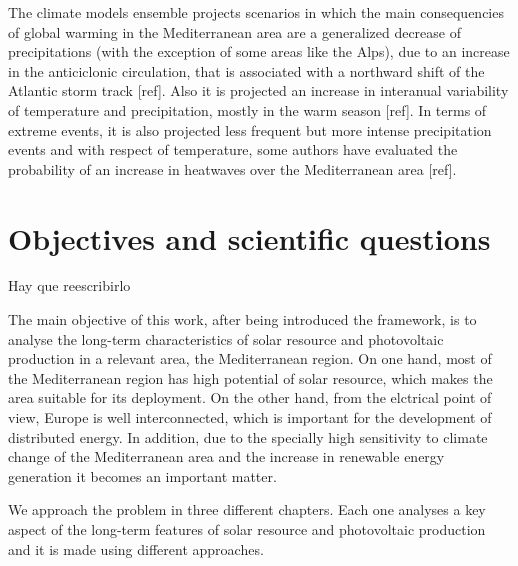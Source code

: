
The climate models ensemble projects scenarios in which the main consequencies of global warming in the Mediterranean area are a generalized decrease of precipitations (with the exception of some areas like the Alps), due to an increase in the anticiclonic circulation, that is associated with a northward shift of the Atlantic storm track [ref]. Also it is projected an increase in interanual variability of temperature and precipitation, mostly in the warm season [ref]. In terms of extreme events, it is also projected less frequent but more intense precipitation events and with respect of temperature, some authors have evaluated the probability of an increase in heatwaves over the Mediterranean area [ref].   

\section{Objectives and scientific questions}%

{\color{red} Hay que reescribirlo}

The main objective of this work, after being introduced the framework, is to analyse the long-term characteristics of solar resource and photovoltaic production in a relevant area, the Mediterranean region. On one hand, most of the Mediterranean region has high potential of solar resource, which makes the area suitable for its deployment. On the other hand, from the elctrical point of view, Europe is well interconnected, which is important for the development of distributed energy. In addition, due to the specially high sensitivity to climate change of the Mediterranean area and the increase in renewable energy generation it becomes an important matter.

We approach the problem in three different chapters. Each one analyses a key aspect of the long-term features of solar resource and photovoltaic production and it is made using different approaches.

